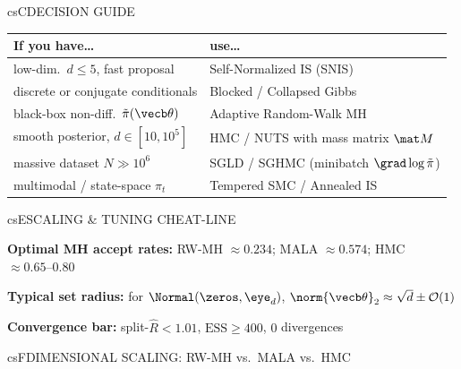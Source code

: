 \documentclass[../../../../master.tex]{subfiles}
\begin{document}
\begin{cscolumns}
\begin{cscard}{csC}{DECISION GUIDE}
  \renewcommand{\arraystretch}{1.22}\small
  \begin{tabular}{@{}>{\raggedright\arraybackslash}p{3.1cm}>{\raggedright\arraybackslash}p{4.6cm}@{}}
    \textbf{If you have\ldots} & \textbf{use\ldots}\\ \hline
    low-dim.\ $d\le 5$, fast proposal & Self-Normalized IS (SNIS)\\
    discrete or conjugate conditionals & Blocked / Collapsed Gibbs\\
    black-box non-diff.\ $\tilde\pi(\vecb\theta)$ & Adaptive Random-Walk MH\\
    smooth posterior, $d\in[10,10^5]$ & HMC / NUTS with mass matrix $\mat M$\\
    massive dataset $N\gg 10^6$ & SGLD / SGHMC (minibatch $\grad\log\tilde\pi$)\\
    multimodal / state-space $\pi_t$ & Tempered SMC / Annealed IS\\
  \end{tabular}
\end{cscard}

\begin{cscard}{csE}{SCALING \& TUNING CHEAT-LINE}
  \begin{csbul}
    \item \textbf{Optimal MH accept rates:} RW-MH $\approx 0.234$; MALA $\approx 0.574$; HMC $\approx 0.65\text{--}0.80$
    \item \textbf{Typical set radius:} for $\Normal(\zeros,\eye_d)$, $\norm{\vecb\theta}_2\approx\sqrt{d}\pm\mathcal O(1)$
    \item \textbf{Convergence bar:} split-$\hat R < 1.01$, $\mathrm{ESS}\ge 400$, $0$ divergences
  \end{csbul}
\end{cscard}

\begin{cscard}{csF}{DIMENSIONAL SCALING: RW-MH vs.\ MALA vs.\ HMC}
  \centering
\end{cscard}
\columnbreak


\end{cscolumns}
\end{document}
